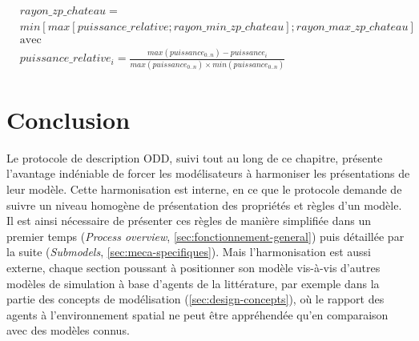 \begin{equation}\label{eq:rayon-zp-chateau}
\begin{aligned}
& rayon\_zp\_chateau = \\
& min \left[ max \left[ puissance\_relative; rayon\_min\_zp\_chateau \right] ; rayon\_max\_zp\_chateau \right]
\\
& \text{avec}
\\
& puissance\_relative_i = \frac{max(puissance_{0..n}) - puissance_i}{max(puissance_{0..n}) \times min(puissance_{0..n})}
\end{aligned}
\end{equation}

\section*{Conclusion}

Le protocole de description ODD, suivi tout au long de ce chapitre, présente l'avantage indéniable de forcer les modélisateurs à harmoniser les présentations de leur modèle.
Cette harmonisation est \og interne\fg{}, en ce que le protocole demande de suivre un niveau homogène de présentation des propriétés et règles d'un modèle.
Il est ainsi nécessaire de présenter ces règles de manière simplifiée dans un premier temps (\textit{Process overview}, \cref{sec:fonctionnement-general}) puis détaillée par la suite (\textit{Submodels}, \cref{sec:meca-specifiques}).
Mais l'harmonisation est aussi \og externe\fg{}, chaque section poussant à positionner son modèle vis-à-vis d'autres modèles de simulation à base d'agents de la littérature, par exemple dans la partie des \og concepts de modélisation\fg{} (\cref{sec:design-concepts}), où le rapport des agents à l'environnement spatial ne peut être appréhendée qu'en comparaison avec des modèles connus.


